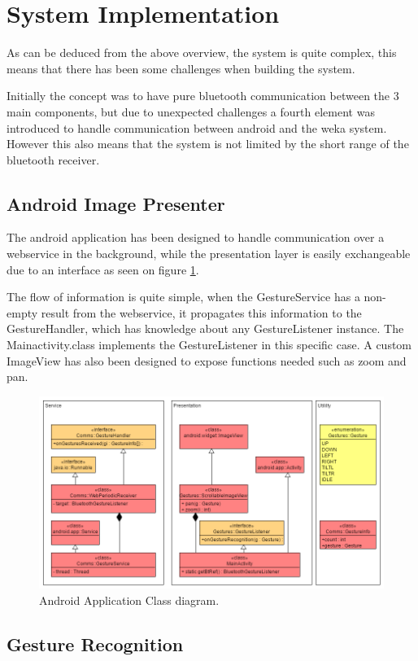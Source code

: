 \section{System Implementation} 
As can be deduced from the above overview, the system is quite complex,
this means that there has been some challenges when building the system.

Initially the concept was to have pure bluetooth communication between the 3 main components,
but due to unexpected challenges a fourth element was introduced to handle communication between android and the weka system. 
However this also means that the system is not limited by the short range of the bluetooth receiver.

\subsection{Android Image Presenter}
The android application has been designed to handle communication over a webservice in the background, 
while the presentation layer is easily exchangeable due to an interface as seen on figure \ref{fig:and_class}.

The flow of information is quite simple, when the GestureService has a non-empty result from the webservice,
it propagates this information to the GestureHandler, which has knowledge about any GestureListener instance.
The Mainactivity.class implements the GestureListener in this specific case.
A custom ImageView has also been designed to expose functions needed such as zoom and pan.

\begin{figure}[!h]
\centering
\includegraphics[width=0.9\columnwidth]{img/android_class_diagram}
\caption{Android Application Class diagram.}
\label{fig:and_class}
\end{figure}


\subsection{Gesture Recognition}
